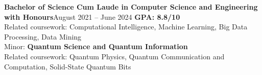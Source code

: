     {\textbf{Bachelor of Science Cum Laude in Computer Science and Engineering with Honours}}{August 2021 -- June 2024}
    \vspace{6pt}
    \textbf{GPA: 8.8/10}\\
    \vspace{6pt}
    \scriptsize {\small{Related coursework: Computational Intelligence, Machine Learning, Big Data Processing, Data Mining}}\\
    \vspace{-3pt}
    \resumeItemListStart
    \resumeItemListEnd
    \scriptsize {\small{Minor: \textbf{Quantum Science and Quantum Information}}}\\
    \scriptsize {\small{Related coursework: Quantum Physics, Quantum Communication and Computation, Solid-State Quantum Bits}}